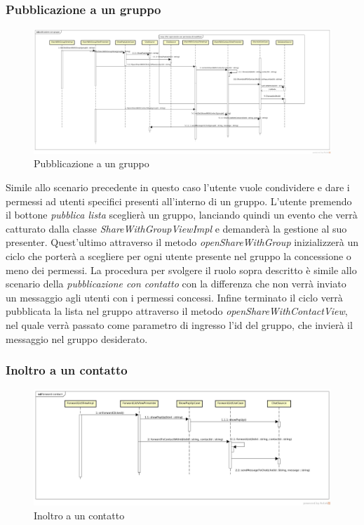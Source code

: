 \subsubsection{Pubblicazione a un gruppo}

\label{Pubblicazione a un gruppo}
\begin{figure}[H]
	\centering
	\includegraphics[width=\textwidth]{Sezioni/Diagrammi/img_app/publicazione_con_gruppo.jpg}
	\caption{Pubblicazione a un gruppo}
	
\end{figure}

Simile allo scenario precedente in questo caso l'utente vuole condividere e dare i permessi ad utenti specifici presenti all'interno di un gruppo. L'utente premendo il bottone \textit{pubblica lista} sceglierà un gruppo, lanciando quindi un evento che verrà catturato dalla classe \textit{ShareWithGroupViewImpl} e demanderà la gestione al suo presenter. Quest'ultimo attraverso il metodo \textit{openShareWithGroup} inizializzerà un ciclo che porterà a scegliere per ogni utente presente nel gruppo la concessione o meno dei permessi. La procedura per svolgere il ruolo sopra descritto è simile allo scenario della \textit{pubblicazione con contatto} con la differenza che non verrà inviato un messaggio agli utenti con i permessi concessi. Infine terminato il ciclo verrà pubblicata la lista nel gruppo attraverso il metodo \textit{openShareWithContactView}, nel quale verrà passato come parametro di ingresso l'id del gruppo, che invierà il messaggio nel gruppo desiderato.

\subsubsection{Inoltro a un contatto}

\label{Inoltro a un contatto}
\begin{figure}[H]
	\centering
	\includegraphics[width=\textwidth]{Sezioni/Diagrammi/img_app/forward_contatto.jpg}
	\caption{Inoltro a un contatto}
	
\end{figure}

